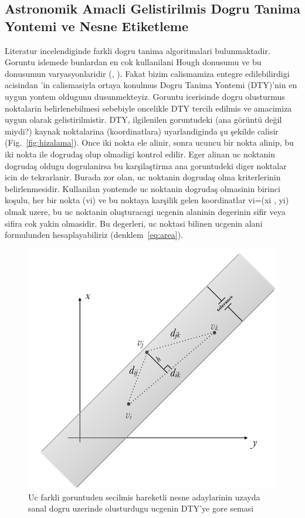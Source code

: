\documentclass[review]{elsarticle}
\begin{document}
\subsection{Astronomik Amacli Gelistirilmis Dogru Tanima Yontemi ve Nesne Etiketleme} \label{sec:objecttags}

Literatur incelendiginde farkli dogru tanima algoritmalari bulunmaktadir. Goruntu islemede bunlardan en cok kullanilani Hough donusumu ve bu donusumun varyasyonlaridir (\citep{hough1962}, \citep{ricard1972}). Fakat bizim calismamiza entegre edilebilirdigi acisindan \citep{chen2001}'in calismasiyla ortaya konulmus Dogru Tanima Yontemi (DTY)'nin en uygun yontem oldugunu dusunmekteyiz. Goruntu icerisinde dogru olusturmus noktalarin belirlenebilmesi sebebiyle oncelikle DTY tercih edilmis ve amacimiza uygun olarak gelistirilmistir. DTY, ilgilenilen goruntudeki (ana görüntü değil miydi?) kaynak noktalarina (koordinatlara) uyarlandiginda şu şekilde calisir (Fig.~\ref{fig:hizalama}). Once iki nokta ele alinir, sonra ucuncu bir nokta alinip, bu iki nokta ile dogrudaş olup olmadigi kontrol edilir. Eger alinan uc noktanin dogrudaş oldugu dogrulanirsa bu karşilaştirma ana goruntudeki diger noktalar icin de tekrarlanir. Burada zor olan, uc noktanin dogrudaş olma kriterlerinin belirlenmesidir. Kullanilan yontemde uc noktanin dogrudaş olmasinin birinci koşulu, her bir nokta (vi) ve bu noktaya karşilik gelen koordinatlar vi=(xi , yi) olmak uzere, bu uc noktanin oluşturacagi ucgenin alaninin degerinin sifir veya sifira cok yakin olmasidir. Bu degerleri, uc noktasi bilinen ucgenin alani formulunden hesaplayabiliriz (denklem~\ref{eq:area}).

\begin{figure}[!t]
  \centering
  \includegraphics[scale=0.50]{dogru_ucgen}
  \caption{Uc farkli goruntuden secilmis hareketli nesne adaylarinin uzayda sanal dogru uzerinde olusturdugu ucgenin DTY'ye gore semasi}
  \label{fig:dogru_ucgen}
\end{figure}
\end{document}
